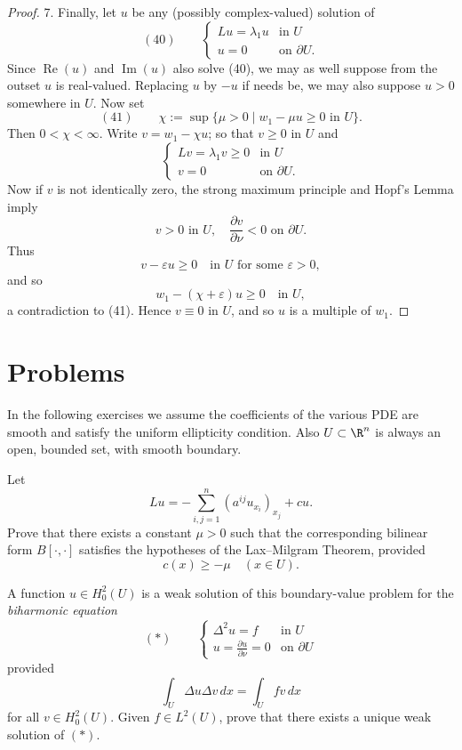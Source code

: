 \begin{proof}
7. Finally, let $u$ be any (possibly complex-valued) solution of
$$(40) \qquad \begin{cases} Lu = \lambda_1u & \text{in } U \\ u = 0 & \text{on } \partial U. \end{cases}$$
Since $\operatorname{Re}(u)$ and $\operatorname{Im}(u)$ also solve (40), we may as well suppose from the outset $u$ is real-valued. Replacing $u$ by $-u$ if needs be, we may also suppose $u > 0$ somewhere in $U$. Now set
$$(41) \qquad \chi := \sup\{\mu > 0 \mid w_1 - \mu u \geq 0 \text{ in } U\}.$$
Then $0 < \chi < \infty$. Write $v = w_1 - \chi u$; so that $v \geq 0$ in $U$ and
$$\begin{cases} Lv = \lambda_1v \geq 0 & \text{in } U \\ v = 0 & \text{on } \partial U. \end{cases}$$
Now if $v$ is not identically zero, the strong maximum principle and Hopf's Lemma imply
$$v > 0 \text{ in } U, \quad \frac{\partial v}{\partial\nu} < 0 \text{ on } \partial U.$$
Thus
$$v - \varepsilon u \geq 0 \quad \text{in } U \text{ for some } \varepsilon > 0,$$
and so
$$w_1 - (\chi+\varepsilon)u \geq 0 \quad \text{in } U,$$
a contradiction to (41). Hence $v \equiv 0$ in $U$, and so $u$ is a multiple of $w_1$.
\end{proof}

\section{Problems}
\label{sec:elliptic-problems}

In the following exercises we assume the coefficients of the various PDE are smooth and satisfy the uniform ellipticity condition. Also $U \subset \R^n$ is always an open, bounded set, with smooth boundary.

\begin{exercise}
Let
$$Lu = -\sum_{i,j=1}^n (a^{ij}u_{x_i})_{x_j} + cu.$$
Prove that there exists a constant $\mu > 0$ such that the corresponding bilinear form $B[\cdot,\cdot]$ satisfies the hypotheses of the Lax--Milgram Theorem, provided
$$c(x) \geq -\mu \quad (x \in U).$$
\end{exercise}

\begin{exercise}
A function $u \in H_0^2(U)$ is a weak solution of this boundary-value problem for the \textit{biharmonic equation}
$$(*) \qquad \begin{cases} \Delta^2u = f & \text{in } U \\ u = \frac{\partial u}{\partial\nu} = 0 & \text{on } \partial U \end{cases}$$
provided
$$\int_U \Delta u \Delta v\,dx = \int_U fv\,dx$$
for all $v \in H_0^2(U)$. Given $f \in L^2(U)$, prove that there exists a unique weak solution of $(*)$.
\end{exercise}

